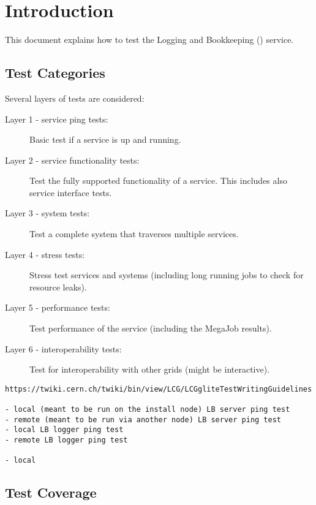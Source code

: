 \section{Introduction}

This document explains how to test the Logging and Bookkeeping (\LB) service. 



\subsection{Test Categories}
Several layers of tests are considered:

\begin{description}
\item[Layer 1 - service ping tests:] Basic test if a service is up and running.
\item[Layer 2 - service functionality tests:] Test the fully supported functionality of a service. This includes also service interface tests.
\item[Layer 3 - system tests:] Test a complete system that traverses multiple services.
\item[Layer 4 - stress tests:] Stress test services and systems (including long running jobs to check for resource leaks).
\item[Layer 5 - performance tests:] Test performance of the service (including the MegaJob results).
\item[Layer 6 - interoperability tests:] Test for interoperability with other grids (might be interactive).
\end{description}

\begin{verbatim}
https://twiki.cern.ch/twiki/bin/view/LCG/LCGgliteTestWritingGuidelines

- local (meant to be run on the install node) LB server ping test                
- remote (meant to be run via another node) LB server ping test  
- local LB logger ping test                                            
- remote LB logger ping test

- local 

\end{verbatim}

\subsection{Test Coverage}


